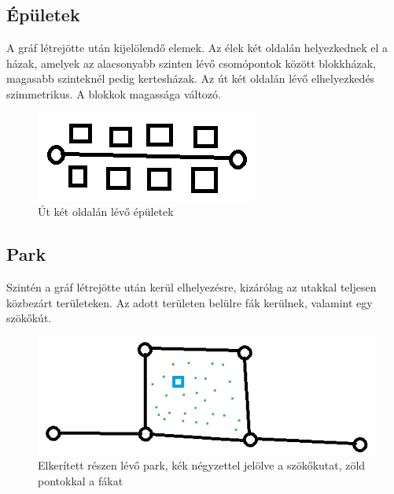 \subsection{Épületek}
A gráf létrejötte után kijelölendő elemek. Az élek két oldalán helyezkednek el a házak, amelyek az alacsonyabb szinten lévő csomópontok között blokkházak, magasabb szinteknél pedig kertesházak. Az út két oldalán lévő elhelyezkedés szimmetrikus. A blokkok magassága változó.
\begin{figure}[H]
\includegraphics[width=\linewidth]{epulet.png}
\caption{Út két oldalán lévő épületek}
\label{fig:builds}
\end{figure}
\subsection{Park}
Szintén a gráf létrejötte után kerül elhelyezésre, kizárólag az utakkal teljesen közbezárt területeken. Az adott területen belülre fák kerülnek, valamint egy szökőkút.
\begin{figure}[H]
\includegraphics[width=\linewidth]{park.png}
\caption{Elkerített részen lévő park, kék négyzettel jelölve a szökőkutat, zöld pontokkal a fákat}
\label{fig:parkmodel}
\end{figure}
